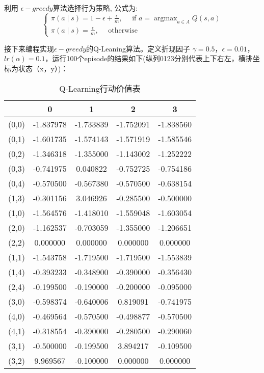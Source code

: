 \documentclass[lang=cn,a4paper]{elegantpaper}
\begin{document}
利用 $ \epsilon -greedy$算法选择行为策略,  公式为:
$$
\left\{\begin{array}{l}
\pi(a \mid s)=1-\epsilon+\frac{\epsilon}{m}, \quad \text { if } a=\operatorname{argmax}_{a \in A} Q(s, a) \\
\pi(a \mid s)=\frac{\epsilon}{m}, \quad \text { otherwise }
\end{array}\right.
$$


接下来编程实现$\epsilon - greedy$的Q-Leaning算法。定义折现因子 $\gamma = 0.5$，$\epsilon = 0.01$，$lr(\alpha) = 0.1$，运行100个episode的结果如下(纵列0123分别代表上下右左，横排坐标为状态（x，y）)：


\begin{table}[htbp]
  \centering
  \caption{Q-Learning行动价值表}
    \begin{tabular}{ccccc}
      \hline
                  &         0&         1&         2&         3 \\
    \hline
    (0,0) & -1.837978& -1.733839& -1.752091& -1.838560 \\
     (0,1)& -1.601735& -1.574143& -1.571919& -1.585546 \\
     (0,2)& -1.346318& -1.355000& -1.143002& -1.252222 \\
     (0,3)& -0.741975&  0.040822& -0.752725& -0.754186 \\
     (0,4)& -0.570500& -0.567380& -0.570500& -0.638154 \\
     (1,3)& -0.301156&  3.046926& -0.285500& -0.500000 \\
     (1,0)& -1.564576& -1.418010& -1.559048& -1.603054 \\
     (2,0)& -1.162537& -0.703059& -1.355000& -1.206651 \\
     (2,2)&  0.000000&  0.000000&  0.000000&  0.000000 \\
     (1,1)& -1.543758& -1.719500& -1.719500& -1.553839 \\
    (1,4) & -0.393233& -0.348900& -0.390000& -0.356430 \\
     (2,4)& -0.199500& -0.190000& -0.200000& -0.095000 \\
     (3,0)& -0.598374& -0.640006&  0.819091& -0.741975 \\
     (4,0)& -0.469564& -0.570500& -0.498877& -0.570500 \\
     (4,1)& -0.318554& -0.390000& -0.280500& -0.290060 \\
     (3,1)& -0.500000& -0.199500&  3.894217& -0.109500 \\
     (3,2)&  9.969567& -0.100000&  0.000000&  0.000000 \\

\end{tabular}
\end{table}
\end{document}
